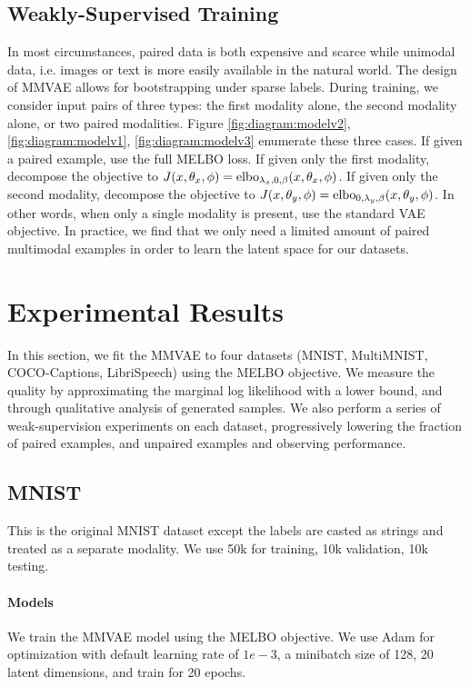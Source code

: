 \documentclass{article}
\begin{document}
\subsection{Weakly-Supervised Training}
In most circumstances, paired data is both expensive and scarce while unimodal data, i.e. images or text is more easily available in the natural world. The design of MMVAE allows for bootstrapping under sparse labels. During training, we consider input pairs of three types: the first modality alone, the second modality alone, or two paired modalities. Figure \ref{fig:diagram:modelv2}, \ref{fig:diagram:modelv1}, \ref{fig:diagram:modelv3} enumerate these three cases. If given a paired example, use the full MELBO loss. If given only the first modality, decompose the objective to $J(x, \theta_{x}, \phi) = \textup{elbo}_{\lambda_{x}, 0, \beta}(x, \theta_{x}, \phi)$. If given only the second modality, decompose the objective to $J(x, \theta_{y}, \phi) = \textup{elbo}_{0, \lambda_{y}, \beta}(x, \theta_{y}, \phi)$. In other words, when only a single modality is present, use the standard VAE objective. In practice, we find that we only need a limited amount of paired multimodal examples in order to learn the latent space for our datasets.

\section{Experimental Results}

In this section, we fit the MMVAE to four datasets (MNIST, MultiMNIST, COCO-Captions, LibriSpeech) using the MELBO objective. We measure the quality by approximating the marginal log likelihood with a lower bound, and through qualitative analysis of generated samples. We also perform a series of weak-supervision experiments on each dataset, progressively lowering the fraction of paired examples, and unpaired examples and observing performance. 

\subsection{MNIST}

This is the original MNIST dataset except the labels are casted as strings and treated as a separate modality. We use 50k for training, 10k validation, 10k testing. 

\paragraph{Models} We train the MMVAE model using the MELBO objective. We use Adam for optimization with default learning rate of $1e-3$, a minibatch size of 128, 20 latent dimensions, and train for 20 epochs.
\end{document}
